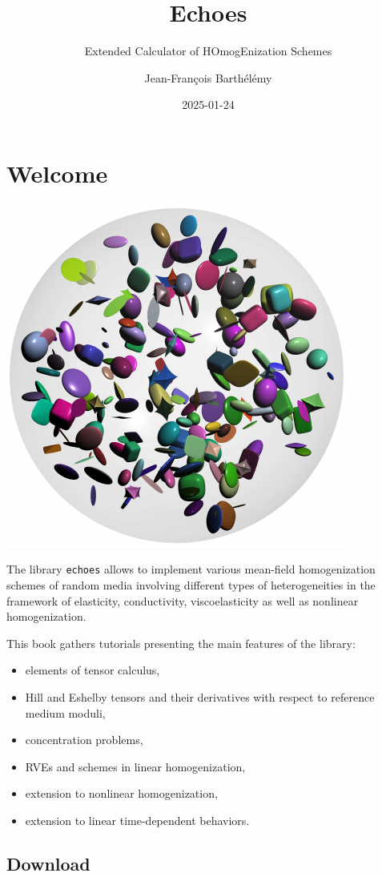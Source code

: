 \documentclass[
  letterpaper,
  DIV=11,
  numbers=noendperiod]{scrreprt}
\title{Echoes}
\subtitle{Extended Calculator of HOmogEnization Schemes}
\author{Jean-François Barthélémy}
\date{2025-01-24}
\providecommand{\tightlist}{%
  \setlength{\itemsep}{0pt}\setlength{\parskip}{0pt}}\usepackage{longtable,booktabs,array}
\renewcommand*\contentsname{Table of contents}
\newcommand\contentsname{Table of contents}
\begin{document}
\maketitle

\renewcommand*\contentsname{Table of contents}
{
\hypersetup{linkcolor=}
\setcounter{tocdepth}{2}
\tableofcontents
}


\chapter*{Welcome}\label{sec-welcome}


\begin{center}
\includegraphics[width=0.2\linewidth,height=\textheight,keepaspectratio]{img/cover.pdf}
\end{center}

The library \texttt{echoes} allows to implement various mean-field
homogenization schemes of random media involving different types of
heterogeneities in the framework of elasticity, conductivity,
viscoelasticity as well as nonlinear homogenization.

This book gathers tutorials presenting the main features of the library:

\begin{itemize}
\tightlist
\item
  elements of tensor calculus,
\item
  Hill and Eshelby tensors and their derivatives with respect to
  reference medium moduli,
\item
  concentration problems,
\item
  RVEs and schemes in linear homogenization,
\item
  extension to nonlinear homogenization,
\item
  extension to linear time-dependent behaviors.
\end{itemize}

\section*{Download}\label{download}
\end{document}
